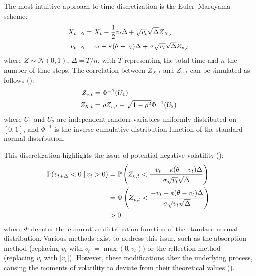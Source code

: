 The most intuitive approach to time discretization is the Euler–Maruyama scheme:
\begin{align}
    X_{t+\Delta} &= X_t - \frac{1}{2}v_t\Delta + \sqrt{v_t}\sqrt{\Delta}Z_{X,t} \notag \\
    v_{t+\Delta} &= v_t + \kappa(\theta - v_t)\Delta + \sigma\sqrt{v_t}\sqrt{\Delta}Z_{v,t} \notag
\end{align}
where $Z \sim \mathcal{N}(0,1)$, $\Delta = T/n$, with $T$ representing the total time and $n$ the number of time steps. The correlation between $Z_{X,t}$ and $Z_{v,t}$ can be simulated as follows (\cite{andersenEfficientSimulationHeston2007}): %
\begin{align}
    Z_{v,t} &= \Phi^{-1}(U_1) \notag \\
    Z_{X,t} &= \rho Z_{v,t} + \sqrt{1-\rho^2}\Phi^{-1}(U_2) \notag
\end{align}
where $U_1$ and $U_2$ are independent random variables uniformly distributed on $[0,1]$, and $\Phi^{-1}$ is the inverse cumulative distribution function of the standard normal distribution.

This discretization highlights the issue of potential negative volatility (\cite{okhrinSimulatingCoxIngersoll2022}):
\begin{align}
    \mathbb{P}(v_{t+\Delta}<0 \mid v_t>0) &= \mathbb{P}\left(Z_{v,t} < \frac{-v_t-\kappa(\theta-v_t)\Delta}{\sigma\sqrt{v_t}\sqrt{\Delta}}\right) \notag \\
    &= \Phi\left(Z_{v,t} < \frac{-v_t-\kappa(\theta-v_t)\Delta}{\sigma\sqrt{v_t}\sqrt{\Delta}}\right) \notag \\
    &> 0 \notag
\end{align}
where $\Phi$ denotes the cumulative distribution function of the standard normal distribution. Various methods exist to address this issue, such as the absorption method (replacing $v_t$ with $v_t^+ = \max(0, v_t)$) or the reflection method (replacing $v_t$ with $\vert v_t\vert$). However, these modifications alter the underlying process, causing the moments of volatility to deviate from their theoretical values (\cite{okhrinSimulatingCoxIngersoll2022,tsoskounoglouSimulatingHestonModel2024}).

